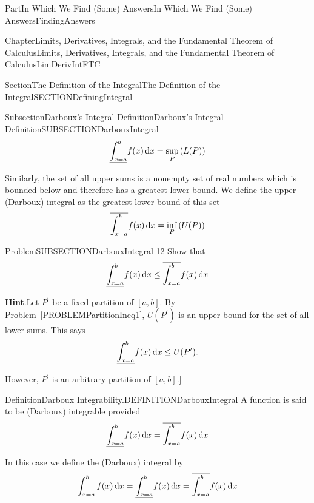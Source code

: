 \documentclass[oneside,10pt,]{book}
\newcommand{\blocktitlefont}{\relax}
\newcommand{\xreffont}{\relax}
\numberwithin{equation}{part}
\newcommand{\dx}[1]{\,{\rm d}#1}
\begin{document}
\begin{partptx}{Part}{In Which We Find (Some) Answers}{}{In Which We Find (Some) Answers}{}{}{FindingAnswers}
\begin{chapterptx}{Chapter}{Limits, Derivatives, Integrals, and the Fundamental Theorem of Calculus}{}{Limits, Derivatives, Integrals, and the Fundamental Theorem of Calculus}{}{}{LimDerivIntFTC}
\begin{sectionptx}{Section}{The Definition of the Integral}{}{The Definition of the Integral}{}{}{SECTIONDefiningIntegral}
\begin{subsectionptx}{Subsection}{Darboux's Integral Definition}{}{Darboux's Integral Definition}{}{}{SUBSECTIONDarbouxIntegral}
\begin{equation*}
\underline{\int^b_{x=a}}{f(x)}\dx{x}=\sup_{P}
\left(L(P)\right)
\end{equation*}
%
\par
Similarly, the set of all upper sums is a non\textendash{}empty set of real numbers which is bounded below and therefore has a greatest lower bound. We define the upper (Darboux) integral as the greatest lower bound of this set%
\begin{equation*}
\overline{\int^{b}_{x=a}}{f(x)\dx{x}}=\inf_{P} \left(U(P)\right)
\end{equation*}
%
\begin{problem}{Problem}{}{SUBSECTIONDarbouxIntegral-12}%
Show that%
\begin{equation*}
\underline{\int^b_{x=a}}{f(x)}\dx{x}\le
\overline{\int^{b}_{x=a}}{f(x)\dx{x}}
\end{equation*}
%
\par\smallskip%
\noindent\textbf{\blocktitlefont Hint}.\hypertarget{SUBSECTIONDarbouxIntegral-12-2}{}\quad{}Let \(P^\prime\) be a fixed partition of \([a,b]\). By \hyperref[PROBLEMPartitionIneq1]{Problem~{\xreffont\ref{PROBLEMPartitionIneq1}}}, \(U(P^\prime)\) is an upper bound for the set of all lower sums.  This says%
\begin{equation*}
\underline{\int^b_{  x=a  }}{f(x)}\dx{x}\le U(P^\prime)\text{.}
\end{equation*}
%
\par
However, \(P^\prime\) is an arbitrary partition of \([a,b]\).]%
\end{problem}
\begin{definition}{Definition}{Darboux Integrability.}{DEFINITIONDarbouxIntegral}%
%
%
A function is said to be (Darboux) integrable provided%
\begin{equation*}
\underline{\int^b_{x=a}}{f(x)}\dx{x}=\overline{\int^{b}_{x=a}}{f(x)\dx{x}}
\end{equation*}
%
\par
In this case we define the (Darboux) integral by%
\begin{equation*}
\int^b_{x=a}{f(x)\dx{x}}=\underline{\int^b_{x=a}}{f(x)}\dx{x}=\overline{\int^{b}_{x=a}}{f(x)\dx{x}}
\end{equation*}
%
\end{definition}

\end{subsectionptx}
\end{sectionptx}
\end{chapterptx}
\end{partptx}
\end{document}
